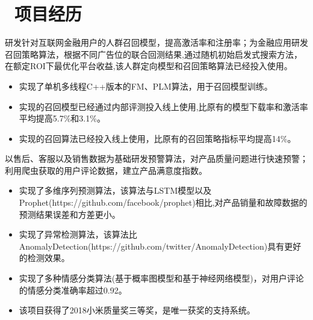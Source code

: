 \documentclass{resume}
\begin{document}

\section{\faUsers\ 项目经历}

\begin{onehalfspacing}
研发针对互联网金融用户的人群召回模型，提高激活率和注册率；为金融应用研发召回策略算法，根据不同广告位的联合回测结果,通过随机初始启发式搜索方法，在额定ROI下最优化平台收益,该人群定向模型和召回策略算法已经投入使用。
\begin{itemize}
  \item 实现了单机多线程C++版本的FM、PLM算法，用于召回模型训练。
  \item 实现的召回模型已经通过内部评测投入线上使用,比原有的模型下载率和激活率平均提高5.7\%和3.1\%。
  \item 实现的召回算法已经投入线上使用，比原有的召回策略指标平均提高14\%。
\end{itemize}
\end{onehalfspacing}


\begin{onehalfspacing}
以售后、客服以及销售数据为基础研发预警算法，对产品质量问题进行快速预警；利用爬虫获取的用户评论数据，建立产品满意度指数。
\begin{itemize}
  \item 实现了多维序列预测算法，该算法与LSTM模型以及Prophet(https://github.com/facebook/prophet)相比,对产品销量和故障数据的预测结果误差和方差更小。
  \item 实现了异常检测算法，该算法比AnomalyDetection(https://github.com/twitter/AnomalyDetection)具有更好的检测效果。
  \item 实现了多种情感分类算法(基于概率图模型和基于神经网络模型)，对用户评论的情感分类准确率超过0.92。
  \item 该项目获得了2018小米质量奖三等奖，是唯一获奖的支持系统。
\end{itemize}
\end{onehalfspacing}
\end{document}
